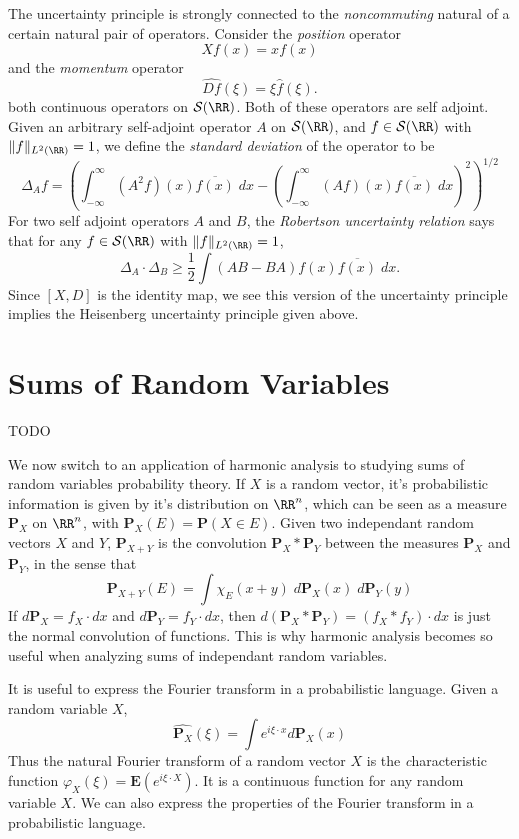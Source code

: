 The uncertainty principle is strongly connected to the \emph{noncommuting} natural of a certain natural pair of operators. Consider the \emph{position} operator
%
\[ Xf(x) = x f(x) \]
%
and the \emph{momentum} operator
%
\[ \widehat{Df}(\xi) = \xi \widehat{f}(\xi). \]
%
both continuous operators on $\mathcal{S}(\RR)$. Both of these operators are self adjoint. Given an arbitrary self-adjoint operator $A$ on $\mathcal{S}(\RR)$, and $f \in \mathcal{S}(\RR)$ with $\| f \|_{L^2(\RR)} = 1$, we define the \emph{standard deviation} of the operator to be
%
\[ \Delta_A f = \left( \int_{-\infty}^\infty (A^2 f)(x) \overline{f(x)}\; dx - \left( \int_{-\infty}^\infty (Af)(x) \overline{f(x)}\; dx \right)^2 \right)^{1/2} \]
%
For two self adjoint operators $A$ and $B$, the \emph{Robertson uncertainty relation} says that for any $f \in \mathcal{S}(\RR)$ with $\| f \|_{L^2(\RR)} = 1$,
%
\[ \Delta_A \cdot \Delta_B \geq \frac{1}{2} \int (AB - BA)f(x) \overline{f(x)}\; dx. \]
%
Since $[X,D]$ is the identity map, we see this version of the uncertainty principle implies the Heisenberg uncertainty principle given above.


\section{Sums of Random Variables}

TODO

We now switch to an application of harmonic analysis to studying sums of random variables probability theory. If $X$ is a random vector, it's probabilistic information is given by it's distribution on $\RR^n$, which can be seen as a measure $\mathbf{P}_X$ on $\RR^n$, with $\mathbf{P}_X(E) = \mathbf{P}(X \in E)$. Given two independant random vectors $X$ and $Y$, $\mathbf{P}_{X+Y}$ is the convolution $\mathbf{P}_X * \mathbf{P}_Y$ between the measures $\mathbf{P}_X$ and $\mathbf{P}_Y$, in the sense that
%
\[ \mathbf{P}_{X+Y}(E) = \int \chi_E(x+y)\; d\mathbf{P}_X(x)\; d\mathbf{P}_Y(y) \]
%
If $d\mathbf{P}_X = f_X \cdot dx$ and $d\mathbf{P}_Y = f_Y \cdot dx$, then $d(\mathbf{P}_X * \mathbf{P}_Y) = (f_X * f_Y) \cdot dx$ is just the normal convolution of functions. This is why harmonic analysis becomes so useful when analyzing sums of independant random variables.

It is useful to express the Fourier transform in a probabilistic language. Given a random variable $X$,
%
\[ \widehat{\mathbf{P}_X}(\xi) = \int e^{i \xi \cdot x} d\mathbf{P}_X(x) \]
%
Thus the natural Fourier transform of a random vector $X$ is the {\emph characteristic function} $\varphi_X(\xi) = \mathbf{E}(e^{i \xi \cdot X})$. It is a continuous function for any random variable $X$. We can also express the properties of the Fourier transform in a probabilistic language.

